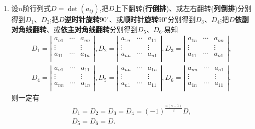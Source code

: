 \documentclass[../../main.tex]{subfiles}%
\begin{document}
\begin{proposition}
\begin{enumerate}
\item 设$n$阶行列式$D=\det(a_{ij})$,把$D$上下翻转(\textbf{行倒排})、或左右翻转(\textbf{列倒排})分别得到$D_1$、$D_2$;把$D$\textbf{逆时针旋转$90^{\circ}$}、或\textbf{顺时针旋转$90^{\circ}$}分别得到$D_3$、$D_4$;把$D$\textbf{依副对角线翻转}、或\textbf{依主对角线翻转}分别得到$D_5$、$D_6$.易知
\begin{align*}
D_1=\left| \begin{matrix}
a_{n1}&		\cdots&		a_{nn}\\
\vdots&		&		\vdots\\
a_{11}&		\cdots&		a_{1n}\\
\end{matrix} \right|,D_2=\left| \begin{matrix}
a_{1n}&		\cdots&		a_{11}\\
\vdots&		&		\vdots\\
a_{nn}&		\cdots&		a_{n1}\\
\end{matrix} \right|,D_3=\left| \begin{matrix}
a_{1n}&		\cdots&		a_{nn}\\
\vdots&		&		\vdots\\
a_{11}&		\cdots&		a_{n1}\\
\end{matrix} \right|,
\\
D_4=\left| \begin{matrix}
a_{n1}&		\cdots&		a_{11}\\
\vdots&		&		\vdots\\
a_{nn}&		\cdots&		a_{1n}\\
\end{matrix} \right|,D_5=\left| \begin{matrix}
a_{nn}&		\cdots&		a_{1n}\\
\vdots&		&		\vdots\\
a_{n1}&		\cdots&		a_{11}\\
\end{matrix} \right|,D_6=\left| \begin{matrix}
a_{nn}&		\cdots&		a_{n1}\\
\vdots&		&		\vdots\\
a_{1n}&		\cdots&		a_{11}\\
\end{matrix} \right|.
\nonumber
\end{align*}
则一定有
\begin{gather*}
D_1=D_2=D_3=D_4=\left( -1 \right) ^{\frac{n\left( n-1 \right)}{2}}D,
\\
D_5=D_6=D.
\nonumber
\end{gather*}


\end{enumerate}
\end{proposition}
\end{document}

